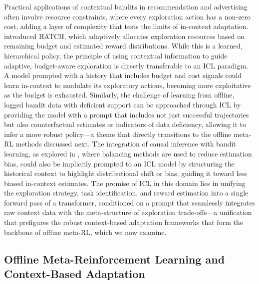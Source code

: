 \documentclass[11pt]{article}
\begin{document}
Practical applications of contextual bandits in recommendation and advertising often involve resource constraints, where every exploration action has a non-zero cost, adding a layer of complexity that tests the limits of in-context adaptation. \cite{ref330} introduced HATCH, which adaptively allocates exploration resources based on remaining budget and estimated reward distributions. While this is a learned, hierarchical policy, the principle of using contextual information to guide adaptive, budget-aware exploration is directly transferable to an ICL paradigm. A model prompted with a history that includes budget and cost signals could learn in-context to modulate its exploratory actions, becoming more exploitative as the budget is exhausted. Similarly, the challenge of learning from offline, logged bandit data with deficient support \cite{ref331} can be approached through ICL by providing the model with a prompt that includes not just successful trajectories but also counterfactual estimates or indicators of data deficiency, allowing it to infer a more robust policy---a theme that directly transitions to the offline meta-RL methods discussed next. The integration of causal inference with bandit learning, as explored in \cite{ref332}, where balancing methods are used to reduce estimation bias, could also be implicitly prompted to an ICL model by structuring the historical context to highlight distributional shift or bias, guiding it toward less biased in-context estimates. The promise of ICL in this domain lies in unifying the exploration strategy, task identification, and reward estimation into a single forward pass of a transformer, conditioned on a prompt that seamlessly integrates raw context data with the meta-structure of exploration trade-offs---a unification that prefigures the robust context-based adaptation frameworks that form the backbone of offline meta-RL, which we now examine.

\subsection{Offline Meta-Reinforcement Learning and Context-Based Adaptation}
\end{document}
